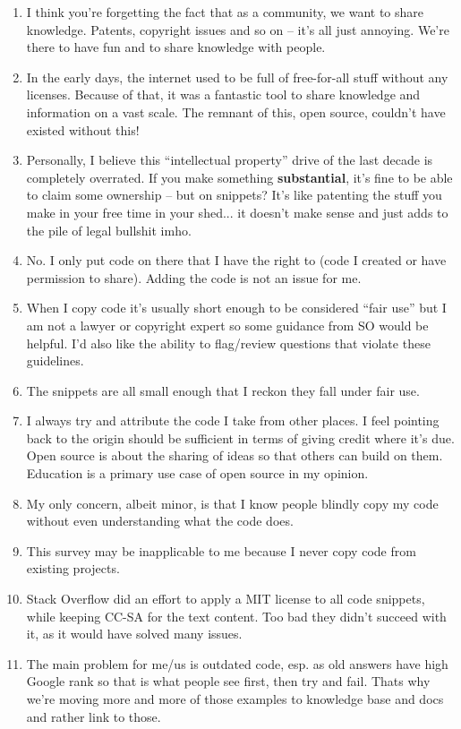 \documentclass{svjour3}                     %
\begin{document}
\begin{enumerate}
	\item I think you're forgetting the fact that as a community, we want to share knowledge. Patents, copyright issues and so on -- it's all just annoying. We're there to have fun and to share knowledge with people. 
	\item In the early days, the internet used to be full of free-for-all stuff without any licenses. Because of that, it was a fantastic tool to share knowledge and information on a vast scale. The remnant of this, open source, couldn't have existed without this!
	\item Personally, I believe this ``intellectual property'' drive of the last decade is completely overrated. If you make something \textbf{substantial}, it's fine to be able to claim some ownership -- but on snippets? It's like patenting the stuff you make in your free time in your shed... it doesn't make sense and just adds to the pile of legal bullshit imho.
	\item No. I only put code on there that I have the right to (code I created or have permission to share). Adding the code is not an issue for me.
	\item When I copy code it's usually short enough to be considered ``fair use'' but I am not a lawyer or copyright expert so some guidance from SO would be helpful. I'd also like the ability to flag/review questions that violate these guidelines.
	\item The snippets are all small enough that I reckon they fall under fair use.
	\item I always try and attribute the code I take from other places. I feel pointing back to the origin should be sufficient in terms of giving credit where it's due. Open source is about the sharing of ideas so that others can build on them. Education is a primary use case of open source in my opinion.
	\item My only concern, albeit minor, is that I know people blindly copy my code without even understanding what the code does.
	\item This survey may be inapplicable to me because I never copy code from existing projects.
	\item Stack Overflow did an effort to apply a MIT license to all code snippets, while keeping CC-SA for the text content. Too bad they didn't succeed with it, as it would have solved many issues.
	\item The main problem for me/us is outdated code, esp. as old answers have high Google rank so that is what people see first, then try and fail. Thats why we're moving more and more of those examples to knowledge base and docs and rather link to those.

\end{enumerate}
\end{document}
